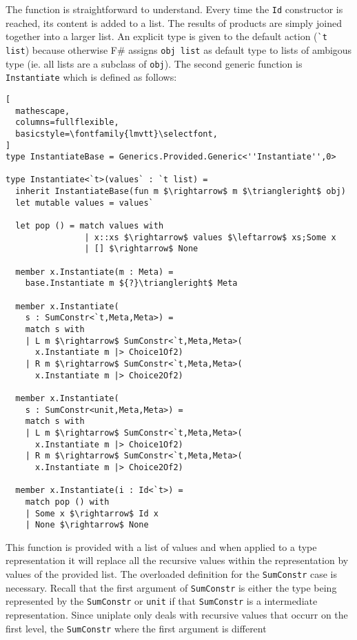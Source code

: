 \documentclass{sigplanconf}
\begin{document}
The function is straightforward to understand. Every time
the \verb+Id+ constructor is reached, its content is added
to a list. The results of products are simply joined
together into a larger list. An explicit type is given
to the default action (\verb+`t list+) because otherwise
F\# assigns \verb+obj list+ as default type to lists of
ambigous type (ie. all lists are a subclass of \verb+obj+).
The second generic function is \verb+Instantiate+ which is
defined as follows:
\begin{lstlisting}[
  mathescape,
  columns=fullflexible,
  basicstyle=\fontfamily{lmvtt}\selectfont,
]
type InstantiateBase = Generics.Provided.Generic<''Instantiate'',0>

type Instantiate<`t>(values` : `t list) =
  inherit InstantiateBase(fun m $\rightarrow$ m $\triangleright$ obj)
  let mutable values = values`

  let pop () = match values with
                | x::xs $\rightarrow$ values $\leftarrow$ xs;Some x
                | [] $\rightarrow$ None

  member x.Instantiate(m : Meta) =
    base.Instantiate m ${?}\triangleright$ Meta

  member x.Instantiate(
    s : SumConstr<`t,Meta,Meta>) =
    match s with
    | L m $\rightarrow$ SumConstr<`t,Meta,Meta>(
      x.Instantiate m |> Choice1Of2)
    | R m $\rightarrow$ SumConstr<`t,Meta,Meta>(
      x.Instantiate m |> Choice2Of2)

  member x.Instantiate(
    s : SumConstr<unit,Meta,Meta>) =
    match s with
    | L m $\rightarrow$ SumConstr<`t,Meta,Meta>(
      x.Instantiate m |> Choice1Of2)
    | R m $\rightarrow$ SumConstr<`t,Meta,Meta>(
      x.Instantiate m |> Choice2Of2)

  member x.Instantiate(i : Id<`t>) =
    match pop () with
    | Some x $\rightarrow$ Id x
    | None $\rightarrow$ None

\end{lstlisting}
This function is provided with a list of values and
when applied to a type representation it will replace
all the recursive values within the representation
by values of the provided list. The overloaded
definition for the \verb+SumConstr+ case is necessary.
Recall that the first argument of \verb+SumConstr+ is either
the type being represented by the \verb+SumConstr+ or
\verb+unit+ if that \verb+SumConstr+ is a intermediate
representation. Since uniplate only deals with
recursive values that occurr on the first level,
the \verb+SumConstr+ where the first argument is different
\end{document}
